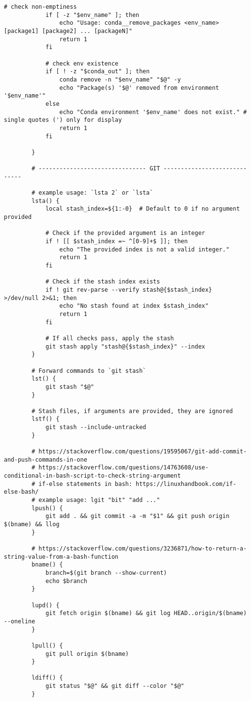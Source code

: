 \documentclass[12pt, a4paper]{article}
\numberwithin{equation}{section}
\theoremstyle{definition}
\theoremstyle{definition}
\begin{document}
\begin{lstlisting}[style=mystylebash, label=alg:bashrc_contents, caption=Contents of .bashrc file, xleftmargin=\parindent]
			# check non-emptiness
			if [ -z "$env_name" ]; then
				echo "Usage: conda__remove_packages <env_name> [package1] [package2] ... [packageN]"
				return 1
			fi 
			
			# check env existence
			if [ ! -z "$conda_out" ]; then
				conda remove -n "$env_name" "$@" -y
				echo "Package(s) '$@' removed from environment '$env_name'"
			else
				echo "Conda environment '$env_name' does not exist." # single quotes (') only for display
				return 1	
			fi
			
		}
		
		# ------------------------------- GIT -----------------------------

		# example usage: `lsta 2` or `lsta` 
		lsta() {
			local stash_index=${1:-0}  # Default to 0 if no argument provided
			
			# Check if the provided argument is an integer
			if ! [[ $stash_index =~ ^[0-9]+$ ]]; then
				echo "The provided index is not a valid integer."
				return 1
			fi
			
			# Check if the stash index exists
			if ! git rev-parse --verify stash@{$stash_index} >/dev/null 2>&1; then
				echo "No stash found at index $stash_index"
				return 1  
			fi
			
			# If all checks pass, apply the stash
			git stash apply "stash@{$stash_index}" --index
		}
		
		# Forward commands to `git stash`
		lst() {
			git stash "$@"
		}
		
		# Stash files, if arguments are provided, they are ignored
		lstf() {
			git stash --include-untracked
		}

		# https://stackoverflow.com/questions/19595067/git-add-commit-and-push-commands-in-one
		# https://stackoverflow.com/questions/14763608/use-conditional-in-bash-script-to-check-string-argument
		# if-else statements in bash: https://linuxhandbook.com/if-else-bash/
		# example usage: lgit "bit" "add ..."
		lpush() {
			git add . && git commit -a -m "$1" && git push origin $(bname) && llog
		}
	
		# https://stackoverflow.com/questions/3236871/how-to-return-a-string-value-from-a-bash-function
		bname() {
			branch=$(git branch --show-current)
			echo $branch    
		}
		
		lupd() {
			git fetch origin $(bname) && git log HEAD..origin/$(bname) --oneline
		}
		
		lpull() {
			git pull origin $(bname)
		}
		
		ldiff() {
			git status "$@" && git diff --color "$@"
		}
		

\end{lstlisting}
\end{document}
